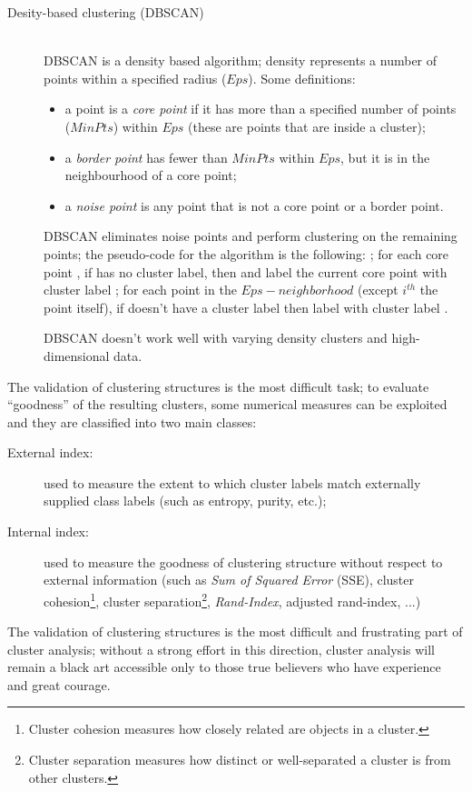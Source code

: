 \begin{description}
\begin{itemize}
	\end{itemize}
	\item[Desity-based clustering (DBSCAN)] \hfill \\
	DBSCAN is a density based algorithm; density represents a number of points within a specified radius ($Eps$).
	Some definitions:
	\begin{itemize}
		\item
		a point is a \emph{core point} if it has more than a specified number of points ($MinPts$) within $Eps$ (these are points that are inside a cluster);
		\item
		a \emph{border point} has fewer than $MinPts$ within $Eps$, but it is in the neighbourhood of a core point;
		\item
		a \emph{noise point} is any point that is not a core point or a border point.
	\end{itemize}
	DBSCAN eliminates noise points and perform clustering on the remaining points; the pseudo-code for the algorithm is the following:
	; for each core point , if  has no cluster label, then  and label the current core point  with cluster label ; for each point  in the $Eps-neighborhood$ (except $i^{th}$ the point itself), if  doesn't have a cluster label then label  with cluster label .

	DBSCAN doesn't work well with varying density clusters and high-dimensional data.
\end{description}

The validation of clustering structures is the most difficult task; to evaluate ``goodness'' of the resulting clusters, some numerical measures can be exploited and they are classified into two main classes:
\begin{description}
	\item[External index:] used to measure the extent to which cluster labels match externally supplied class labels (such as entropy, purity, etc.);
	\item[Internal index:] used to measure the goodness of clustering structure without respect to external information (such as \emph{Sum of Squared Error} (SSE), cluster cohesion\footnote{Cluster cohesion measures how closely related are objects in a cluster.}, cluster separation\footnote{Cluster separation measures how distinct or well-separated a cluster is from other clusters.}, \emph{Rand-Index}, adjusted rand-index, ...)
\end{description}

The validation of clustering structures is the most difficult and frustrating part of cluster analysis; without a strong effort in this direction, cluster analysis will remain a black art accessible only to those true believers who have experience and great courage.